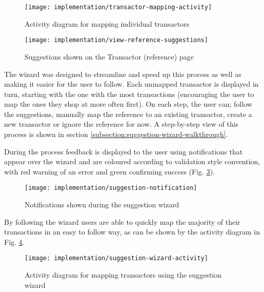 \begin{figure}[h]
    \centering
    \texttt{[image: implementation/transactor-mapping-activity]}
    \caption{Activity diagram for mapping individual transactors}
    \label{fig:transactor-mapping-activity}
    
    \begin{comment}
(start)->(Open Statement)->(Search Statement)-><a>->(end)
<a>->(Open Transactor)->(Map Transactor)->(Open Statement)
    \end{comment}
\end{figure}

\begin{figure}[h]
    \centering
    \texttt{[image: implementation/view-reference-suggestions]}
    \caption{Suggestions shown on the Transactor (reference) page}
    \label{fig:view-reference-suggestions}
\end{figure}

The wizard was designed to streamline and speed up this process as well as making it easier for the user to follow. Each unmapped transactor is displayed in turn, starting with the one with the most transactions (encouraging the user to map the ones they shop at more often first). On each step, the user can; follow the suggestions, manually map the reference to an existing transactor, create a new transactor or ignore the reference for now. A step-by-step view of this process is shown in section \ref{subsection:suggestion-wizard-walkthrough}.

During the process feedback is displayed to the user using notifications that appear over the wizard and are coloured according to validation style convention, with red warning of an error and green confirming success (Fig. \ref{fig:suggestion-notification}). 

\begin{figure}[h]
    \centering
    \texttt{[image: implementation/suggestion-notification]}
    \caption{Notifications shown during the suggestion wizard}
    \label{fig:suggestion-notification}
\end{figure}

By following the wizard users are able to quickly map the majority of their transactions in an easy to follow way, as can be shown by the activity diagram in Fig. \ref{fig:suggestion-wizard-activity}.

\begin{figure}[h]
    \centering
    \texttt{[image: implementation/suggestion-wizard-activity]}
    \caption{Activity diagram for mapping transactors using the suggestion wizard}
    \label{fig:suggestion-wizard-activity}
    
    \begin{comment}
(start)->(Map Transactor)-><a>->(end)
<a>->(Map Transactor)
    \end{comment}
\end{figure}

